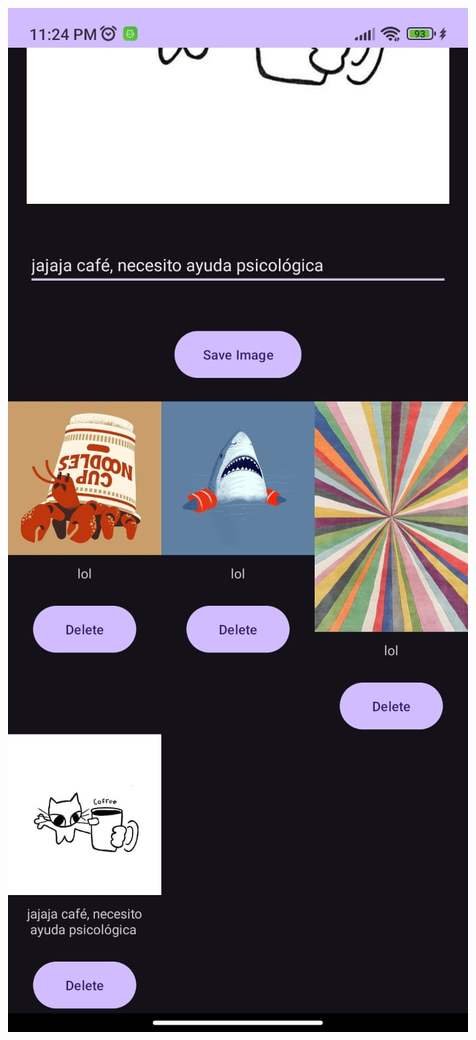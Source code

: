 \documentclass[conference]{IEEEtran}
\begin{document}
{\includegraphics[width=\breite\linewidth]{figura2a.jpeg}}\\
\end{document}
